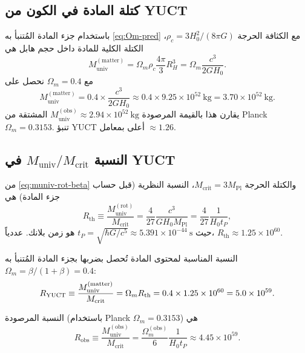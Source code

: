 \documentclass[12pt,a4paper]{article}
\begin{document}
	\subsection{كتلة المادة في الكون من YUCT}
	
	باستخدام جزء المادة المُتنبأ به \eqref{eq:Om-pred} مع الكثافة الحرجة \(\rho_c = 3H_0^2/(8\pi G)\)، الكتلة الكلية للمادة داخل حجم هابل هي
	\begin{equation}
		M_{\mathrm{univ}}^{\mathrm{(matter)}} = \Omega_m \rho_c \frac{4\pi}{3} R_H^3 = \Omega_m \frac{c^3}{2 G H_0}.
		\label{eq:muniv-matter}
	\end{equation}
	مع \(\Omega_m = 0.4\) نحصل على
	\[
	M_{\mathrm{univ}}^{\mathrm{(matter)}} = 0.4 \times \frac{c^3}{2 G H_0} \approx 0.4 \times 9.25\times 10^{52}\ \mathrm{kg} = 3.70\times 10^{52}\ \mathrm{kg}.
	\]
	يقارن هذا بالقيمة المرصودة \(M_{\mathrm{univ}}^{\mathrm{(obs)}} \approx 2.94\times 10^{52}\ \mathrm{kg}\) المشتقة من Planck \(\Omega_m = 0.3153\). تنبؤ YUCT أعلى بمعامل \(\approx 1.26\).
	
	\subsection{النسبة \(M_{\mathrm{univ}} / M_{\mathrm{crit}}\) في YUCT}
	
	من \eqref{eq:muniv-rot-beta} والكتلة الحرجة \(M_{\mathrm{crit}} = 3 M_{\mathrm{Pl}}\)، النسبة النظرية (قبل حساب جزء المادة) هي
	\begin{equation}
		R_{\mathrm{th}} \equiv \frac{M_{\mathrm{univ}}^{\mathrm{(rot)}}}{M_{\mathrm{crit}}} = \frac{4}{27} \frac{c^3}{G H_0 M_{\mathrm{Pl}}} = \frac{4}{27} \frac{1}{H_0 t_P},
		\label{eq:Rth}
	\end{equation}
	حيث \(t_P = \sqrt{\hbar G / c^5} \approx 5.391\times 10^{-44}\ \mathrm{s}\) هو زمن بلانك. عددياً، \(R_{\mathrm{th}} \approx 1.25\times 10^{60}\).
	
	النسبة المناسبة لمحتوى المادة تُحصل بضربها بجزء المادة المُتنبأ به \(\Omega_m = \beta/(1+\beta) = 0.4\):
	\begin{equation}
		\small
		R_{\mathrm{YUCT}} \equiv \frac{M_{\mathrm{univ}}^{\mathrm{(matter)}}}{M_{\mathrm{crit}}} = \Omega_m R_{\mathrm{th}} = 0.4 \times 1.25\times 10^{60} = 5.0\times 10^{59}.
		\label{eq:RYUCT}
	\end{equation}
	
	النسبة المرصودة (باستخدام Planck \(\Omega_m = 0.3153\)) هي
	\begin{equation}
		R_{\mathrm{obs}} \equiv \frac{M_{\mathrm{univ}}^{\mathrm{(obs)}}}{M_{\mathrm{crit}}} = \frac{\Omega_m^{\mathrm{(obs)}}}{6} \frac{1}{H_0 t_P} \approx 4.45\times 10^{59}.
		\label{eq:Robs}
	\end{equation}
	
\end{document}
